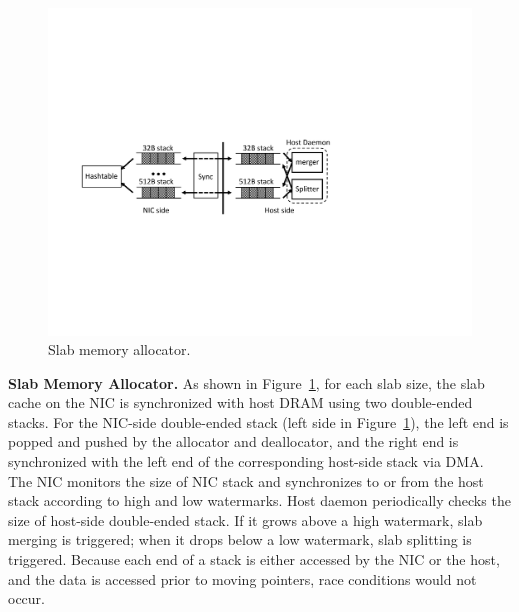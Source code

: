 \begin{figure}[t]
\centering
\includegraphics[width=.8\textwidth,page=1]{figure/cropped_slab.pdf}
\caption{Slab memory allocator.}
\label{kvdirect:fig:slab}

\end{figure}


\textbf{Slab Memory Allocator.}
As shown in Figure~\ref{kvdirect:fig:slab}, for each slab size, the slab cache on the NIC is synchronized with host DRAM using two double-ended stacks.
For the NIC-side double-ended stack (left side in Figure~\ref{kvdirect:fig:slab}), the left end is popped and pushed by the allocator and deallocator, and the right end is synchronized with the left end of the corresponding host-side stack via DMA.
The NIC monitors the size of NIC stack and synchronizes to or from the host stack according to high and low watermarks.
Host daemon periodically checks the size of host-side double-ended stack. If it grows above a high watermark, slab merging is triggered; when it drops below a low watermark, slab splitting is triggered.
Because each end of a stack is either accessed by the NIC or the host, and the data is accessed prior to moving pointers, race conditions would not occur.






